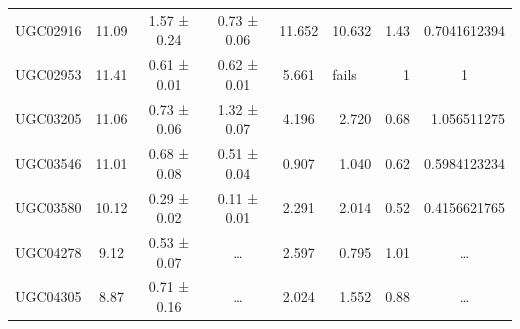 \documentclass[reprint,%
 amsmath,amssymb,
 aps,
]{revtex4-1}
\begin{document}
\begin{table}[]
\begin{tabular}{cccccrrc}
\rowcolor[HTML]{F3F3F3} 
UGC02916             & 11.09                     & 1.57 ± 0.24           & 0.73 ± 0.06            & 11.652                                                       & 10.632                                                          & 1.43                                                          & \multicolumn{1}{r}{\cellcolor[HTML]{F3F3F3}0.7041612394}      \\
\rowcolor[HTML]{F3F3F3} 
UGC02953             & 11.41                     & 0.61 ± 0.01           & 0.62 ± 0.01            & 5.661                                                        & \multicolumn{1}{l}{\cellcolor[HTML]{F3F3F3}fails}                     & 1                                                                     & 1                                                             \\
\rowcolor[HTML]{F3F3F3} 
UGC03205             & 11.06                     & 0.73 ± 0.06           & 1.32 ± 0.07            & 4.196                                                        & 2.720                                                        & 0.68                                                         & \multicolumn{1}{r}{\cellcolor[HTML]{F3F3F3}1.056511275}       \\
\rowcolor[HTML]{F3F3F3} 
UGC03546             & 11.01                     & 0.68 ± 0.08           & 0.51 ± 0.04            & 0.907                                                        & 1.040                                                         & 0.62                                                          & \multicolumn{1}{r}{\cellcolor[HTML]{F3F3F3}0.5984123234}      \\
\rowcolor[HTML]{F3F3F3} 
UGC03580             & 10.12                     & 0.29 ± 0.02           & 0.11 ± 0.01            & 2.291                                                        & 2.014                                                         & 0.52                                                          & \multicolumn{1}{r}{\cellcolor[HTML]{F3F3F3}0.4156621765}      \\
\rowcolor[HTML]{F3F3F3} 
UGC04278             & 9.12                      & 0.53 ± 0.07           & …                      & 2.597                                                        & 0.795                                                          & 1.01                                                          & …                                                             \\
\rowcolor[HTML]{F3F3F3} 
UGC04305             & 8.87                      & 0.71 ± 0.16           & …                      & 2.024                                                        & 1.552                                                        & 0.88                                                           & …                                                             \\

\end{tabular}
\end{table}
\end{document}
